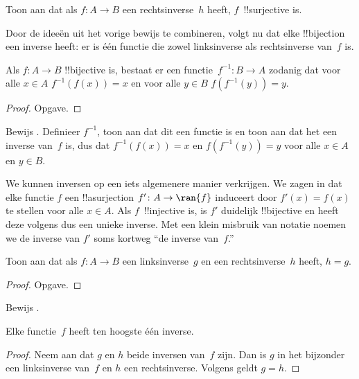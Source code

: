 \documentclass[../../../include/open-logic-section]{subfiles}
\begin{document}
\begin{prob}
Toon aan dat als $f\colon A \to B$ een rechtsinverse~$h$ heeft,
$f$~!!{surjective} is.
\end{prob}

\begin{explain}
  Door de ideeën uit het vorige bewijs te combineren, volgt nu dat
  elke !!{bijection} een inverse heeft: er is één functie die zowel
  linksinverse als rechtsinverse van~$f$ is.
\end{explain}

\begin{prop}
Als $f\colon A \to B$ !!{bijective} is, bestaat er een
functie~$f^{-1}\colon B \to A$ zodanig dat voor alle $x \in A$
$f^{-1}(f(x)) = x$ en voor alle $y \in B$ $f(f^{-1}(y)) = y$.
\end{prop}

\begin{proof}
Opgave.
\end{proof}

\begin{prob}
Bewijs . Definieer
$f^{-1}$, toon aan dat dit een functie is en toon aan dat het een
inverse van~$f$ is, dus dat $f^{-1}(f(x)) = x$ en
$f(f^{-1}(y)) = y$ voor alle $x \in A$ en $y \in B$.
\end{prob}

\begin{explain}
We kunnen inversen op een iets algemenere manier verkrijgen. We zagen
in  dat elke functie $f$ een !!a{surjection}
$f' \colon A \to \ran{f}$ induceert door $f'(x) = f(x)$ te stellen
voor alle $x \in A$. Als $f$~!!{injective} is, is $f'$ duidelijk
!!{bijective} en heeft deze volgens
 dus een unieke inverse. Met een klein
misbruik van notatie noemen we de inverse van $f'$ soms kortweg
``de inverse van~$f$.''
\end{explain}

\begin{prop}%
  Toon aan dat als $f\colon A \to B$ een linksinverse~$g$ en een
  rechtsinverse~$h$ heeft, $h = g$.
\end{prop}

\begin{proof}
  Opgave.
\end{proof}

\begin{prob}
  Bewijs .
\end{prob}

\begin{prop}
Elke functie~$f$ heeft ten hoogste één inverse.
\end{prop}

\begin{proof}
  Neem aan dat $g$ en $h$ beide inversen van~$f$ zijn. Dan is $g$ in
  het bijzonder een linksinverse van~$f$ en $h$ een rechtsinverse.
  Volgens  geldt $g = h$.
\end{proof}
\end{document}
